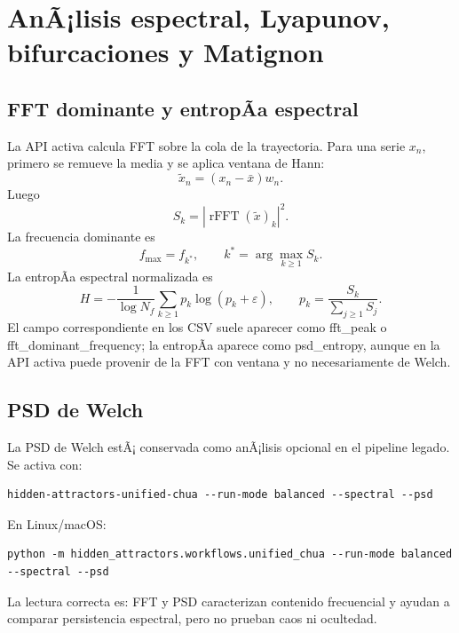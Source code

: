 \documentclass[11pt]{article}
\DeclareRobustCommand{\codepath}[1]{\begingroup\Urlmuskip=0mu plus 2mu\path{#1}\endgroup}
\def\codepath#1{#1}%
\begin{document}
\section{AnÃ¡lisis espectral, Lyapunov, bifurcaciones y Matignon}
\label{sec:analisis_adicionales_disponibles}

\subsection{FFT dominante y entropÃ­a espectral}

La API activa calcula FFT sobre la cola de la trayectoria. Para una serie \(x_n\), primero se remueve la media y se aplica ventana de Hann:
\begin{equation}
\tilde x_n=(x_n-\bar x)w_n.
\end{equation}
Luego
\begin{equation}
S_k=|\operatorname{rFFT}(\tilde x)_k|^2.
\end{equation}
La frecuencia dominante es
\begin{equation}
f_{\max}=f_{k^*},
\qquad k^*=\arg\max_{k\geq1}S_k.
\end{equation}
La entropÃ­a espectral normalizada es
\begin{equation}
H=-\frac{1}{\log N_f}\sum_{k\geq1}p_k\log(p_k+\varepsilon),
\qquad
p_k=\frac{S_k}{\sum_{j\geq1}S_j}.
\end{equation}
El campo correspondiente en los CSV suele aparecer como \codepath{fft_peak} o \codepath{fft_dominant_frequency}; la entropÃ­a aparece como \codepath{psd_entropy}, aunque en la API activa puede provenir de la FFT con ventana y no necesariamente de Welch.

\subsection{PSD de Welch}

La PSD de Welch estÃ¡ conservada como anÃ¡lisis opcional en el pipeline legado. Se activa con:
\begin{lstlisting}
hidden-attractors-unified-chua --run-mode balanced --spectral --psd
\end{lstlisting}
En Linux/macOS:
\begin{lstlisting}
python -m hidden_attractors.workflows.unified_chua --run-mode balanced --spectral --psd
\end{lstlisting}
La lectura correcta es: FFT y PSD caracterizan contenido frecuencial y ayudan a comparar persistencia espectral, pero no prueban caos ni ocultedad.
\end{document}
